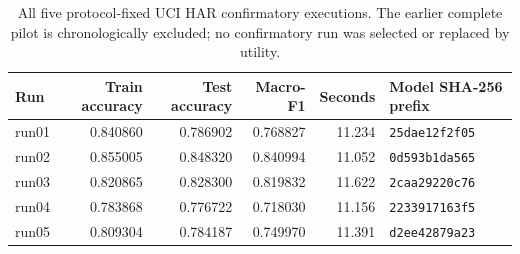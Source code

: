 \begin{table}[t]
\centering
\small
\begin{tabular}{lrrrrl}
\hline
Run & Train accuracy & Test accuracy & Macro-F1 & Seconds & Model SHA-256 prefix \\
\hline
run01 & 0.840860 & 0.786902 & 0.768827 & 11.234 & \texttt{25dae12f2f05} \\
run02 & 0.855005 & 0.848320 & 0.840994 & 11.052 & \texttt{0d593b1da565} \\
run03 & 0.820865 & 0.828300 & 0.819832 & 11.622 & \texttt{2caa29220c76} \\
run04 & 0.783868 & 0.776722 & 0.718030 & 11.156 & \texttt{2233917163f5} \\
run05 & 0.809304 & 0.784187 & 0.749970 & 11.391 & \texttt{d2ee42879a23} \\
\hline
\end{tabular}
\caption{All five protocol-fixed UCI HAR confirmatory executions. The earlier complete pilot is chronologically excluded; no confirmatory run was selected or replaced by utility.}
\label{tab:v5-uci-runs}
\end{table}
